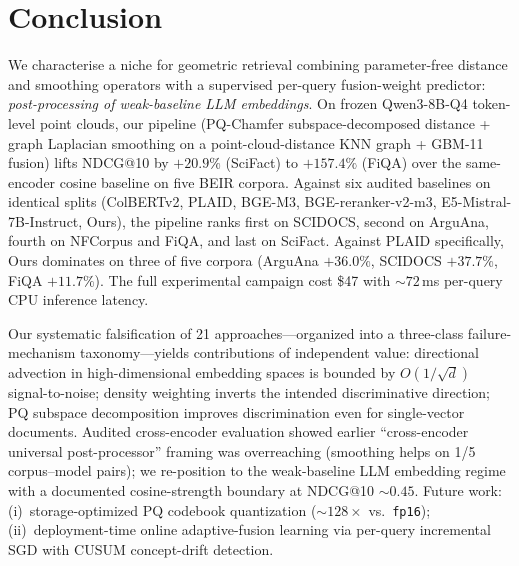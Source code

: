 \documentclass[review,1p]{elsarticle}
\begin{document}
\section{Conclusion}
\label{sec:conclusion}

We characterise a niche for geometric retrieval combining parameter-free distance and smoothing operators with a supervised per-query fusion-weight predictor: \emph{post-processing of weak-baseline LLM embeddings}. On frozen Qwen3-8B-Q4 token-level point clouds, our pipeline (PQ-Chamfer subspace-decomposed distance + graph Laplacian smoothing on a point-cloud-distance KNN graph + GBM-11 fusion) lifts NDCG@10 by $+20.9\%$ (SciFact) to $+157.4\%$ (FiQA) over the same-encoder cosine baseline on five BEIR corpora. Against six audited baselines on identical splits (ColBERTv2, PLAID, BGE-M3, BGE-reranker-v2-m3, E5-Mistral-7B-Instruct, Ours), the pipeline ranks first on SCIDOCS, second on ArguAna, fourth on NFCorpus and FiQA, and last on SciFact. Against PLAID specifically, Ours dominates on three of five corpora (ArguAna $+36.0\%$, SCIDOCS $+37.7\%$, FiQA $+11.7\%$). The full experimental campaign cost \$47 with ${\sim}72$\,ms per-query CPU inference latency.

Our systematic falsification of 21 approaches---organized into a three-class failure-mechanism taxonomy---yields contributions of independent value: directional advection in high-dimensional embedding spaces is bounded by $O(1/\sqrt{d})$ signal-to-noise; density weighting inverts the intended discriminative direction; PQ subspace decomposition improves discrimination even for single-vector documents. Audited cross-encoder evaluation showed earlier ``cross-encoder universal post-processor'' framing was overreaching (smoothing helps on 1/5 corpus--model pairs); we re-position to the weak-baseline LLM embedding regime with a documented cosine-strength boundary at NDCG@10 ${\sim}0.45$. Future work: (i)~storage-optimized PQ codebook quantization (${\sim}128\times$ vs.\ \texttt{fp16}); (ii)~deployment-time online adaptive-fusion learning via per-query incremental SGD with CUSUM concept-drift detection.



\appendix
\end{document}
